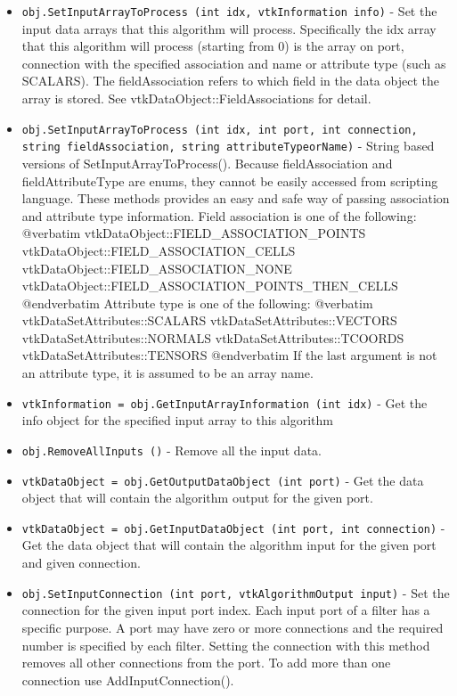 \begin{itemize}
\item  \verb|obj.SetInputArrayToProcess (int idx, vtkInformation info)| -  Set the input data arrays that this algorithm will
 process. Specifically the idx array that this algorithm will process
 (starting from 0) is the array on port, connection with the specified
 association and name or attribute type (such as SCALARS). The
 fieldAssociation refers to which field in the data object the array is
 stored. See vtkDataObject::FieldAssociations for detail.

\item  \verb|obj.SetInputArrayToProcess (int idx, int port, int connection, string fieldAssociation, string attributeTypeorName)| -  String based versions of SetInputArrayToProcess(). Because
 fieldAssociation and fieldAttributeType are enums, they cannot be
 easily accessed from scripting language. These methods provides an
 easy and safe way of passing association and attribute type
 information. Field association is one of the following:
 @verbatim
 vtkDataObject::FIELD\_ASSOCIATION\_POINTS
 vtkDataObject::FIELD\_ASSOCIATION\_CELLS
 vtkDataObject::FIELD\_ASSOCIATION\_NONE
 vtkDataObject::FIELD\_ASSOCIATION\_POINTS\_THEN\_CELLS
 @endverbatim
 Attribute type is one of the following:
 @verbatim
 vtkDataSetAttributes::SCALARS
 vtkDataSetAttributes::VECTORS
 vtkDataSetAttributes::NORMALS
 vtkDataSetAttributes::TCOORDS
 vtkDataSetAttributes::TENSORS
 @endverbatim
 If the last argument is not an attribute type, it is assumed to
 be an array name.

\item  \verb|vtkInformation = obj.GetInputArrayInformation (int idx)| -  Get the info object for the specified input array to this algorithm

\item  \verb|obj.RemoveAllInputs ()| -  Remove all the input data.

\item  \verb|vtkDataObject = obj.GetOutputDataObject (int port)| -  Get the data object that will contain the algorithm output for
 the given port.

\item  \verb|vtkDataObject = obj.GetInputDataObject (int port, int connection)| -  Get the data object that will contain the algorithm input for the given
 port and given connection.

\item  \verb|obj.SetInputConnection (int port, vtkAlgorithmOutput input)| -  Set the connection for the given input port index.  Each input
 port of a filter has a specific purpose.  A port may have zero or
 more connections and the required number is specified by each
 filter.  Setting the connection with this method removes all
 other connections from the port.  To add more than one connection
 use AddInputConnection().


\end{itemize}
